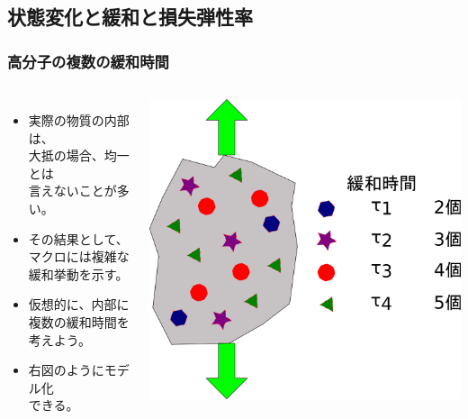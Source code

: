 \documentclass[12pt, dvipdfmx]{beamer}
\begin{document}
\subsection{状態変化と緩和と損失弾性率}
\begin{frame}
	\frametitle{高分子の複数の緩和時間}
		\begin{columns}[c, onlytextwidth]
			\begin{itemize}
				\item 実際の物質の内部は、\\大抵の場合、均一とは\\言えないことが多い。
				\item その結果として、マクロには複雑な緩和挙動を示す。
				\item \alert{仮想的}に、内部に\alert{複数の緩和時間}を考えよう。
				\item 右図のように\alert{モデル化}\\できる。
			\end{itemize}
				\includegraphics[width=\textwidth]{relux_multi.png}
		\end{columns}
\end{frame}
\end{document}
